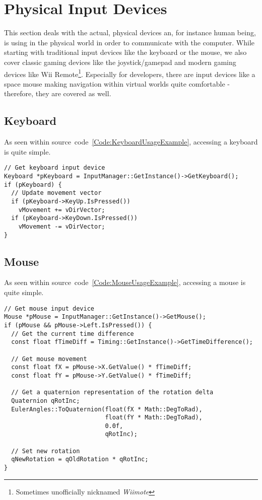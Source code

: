 \section{Physical Input Devices}
\label{Chapter:PhysicalInputDevices}
This section deals with the actual, physical devices an, for instance human being, is using in the physical world in order to communicate with the computer. While starting with traditional input devices like the keyboard or the mouse, we also cover classic gaming devices like the joystick/gamepad and modern gaming devices like Wii Remote\footnote{Sometimes unofficially nicknamed \emph{Wiimote}}. Especially for developers, there are input devices like a space mouse making navigation within virtual worlds quite comfortable - therefore, they are covered as well.




\subsection{Keyboard}
As seen within source~code~\ref{Code:KeyboardUsageExample}, accessing a keyboard is quite simple.
\begin{lstlisting}[float=htb,label=Code:KeyboardUsageExample,caption={Keyboard usage example}]
// Get keyboard input device
Keyboard *pKeyboard = InputManager::GetInstance()->GetKeyboard();
if (pKeyboard) {
  // Update movement vector
  if (pKeyboard->KeyUp.IsPressed())
    vMovement += vDirVector;
  if (pKeyboard->KeyDown.IsPressed())
    vMovement -= vDirVector;
}
\end{lstlisting}




\subsection{Mouse}
As seen within source~code~\ref{Code:MouseUsageExample}, accessing a mouse is quite simple.
\begin{lstlisting}[float=htb,label=Code:MouseUsageExample,caption={Mouse usage example}]
// Get mouse input device
Mouse *pMouse = InputManager::GetInstance()->GetMouse();
if (pMouse && pMouse->Left.IsPressed()) {
  // Get the current time difference
  const float fTimeDiff = Timing::GetInstance()->GetTimeDifference();

  // Get mouse movement
  const float fX = pMouse->X.GetValue() * fTimeDiff;
  const float fY = pMouse->Y.GetValue() * fTimeDiff;

  // Get a quaternion representation of the rotation delta
  Quaternion qRotInc;
  EulerAngles::ToQuaternion(float(fX * Math::DegToRad),
                            float(fY * Math::DegToRad),
                            0.0f,
                            qRotInc);

  // Set new rotation
  qNewRotation = qOldRotation * qRotInc;
}
\end{lstlisting}




